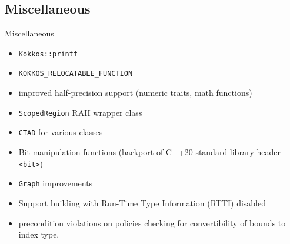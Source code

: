 \subsection{Miscellaneous}
\begin{frame}[fragile]{Miscellaneous}
  \begin{itemize}
    \item \texttt{Kokkos::printf}
    \item \texttt{KOKKOS\_RELOCATABLE\_FUNCTION}
    \item improved half-precision support (numeric traits, math functions)
    \item \texttt{ScopedRegion} RAII wrapper class
    \item \texttt{CTAD} for various classes
    \item Bit manipulation functions (backport of C++20 standard library header \texttt{<bit>})
    \item \texttt{Graph} improvements
    \item Support building with Run-Time Type Information (RTTI) disabled
    \item precondition violations on policies checking for convertibility of bounds to index type.
\end{itemize}
\end{frame}